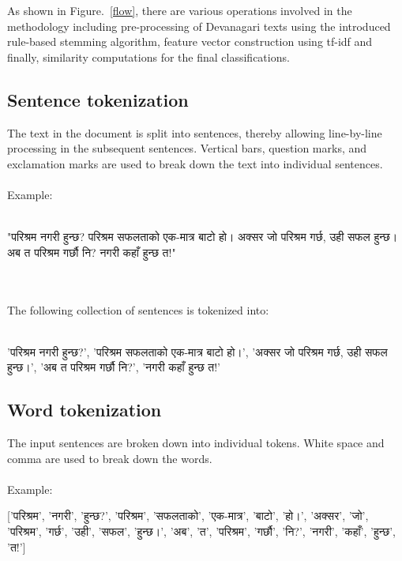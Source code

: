 \documentclass[conference]{IEEEtran}
\begin{document}
As shown in Figure.~\ref{flow}, there are various operations involved in the
methodology including pre-processing of Devanagari texts using the introduced 
rule-based stemming algorithm, feature vector construction using tf-idf and
finally, similarity computations for the final classifications.

\subsection{Sentence tokenization}

The text in the document is split into sentences, thereby allowing line-by-line
processing in the subsequent sentences. Vertical bars, question marks, and 
exclamation marks are used to break down the text into individual sentences. \\
\\Example:\\\\
\begin{sanskrit}
  "परिश्रम नगरी हुन्छ? परिश्रम सफलताको एक-मात्र बाटो हो। अक्सर जो परिश्रम गर्छ, उही सफल हुन्छ। अब त परिश्रम गर्छौ नि? नगरी कहाँ हुन्छ त!"
\end{sanskrit}\\\\
The following collection of sentences is tokenized into:\\\\
  \begin{sanskrit}
  'परिश्रम नगरी हुन्छ?', 'परिश्रम सफलताको एक-मात्र बाटो हो।', 'अक्सर जो परिश्रम गर्छ, उही सफल हुन्छ।', 'अब त परिश्रम गर्छौ नि?', 'नगरी कहाँ हुन्छ त!'
\end{sanskrit}
\medskip

\subsection{Word tokenization}

The input sentences are broken down into individual tokens. White space and
comma are used to break down the words. \\
\\Example:\\
\begin{sanskrit}
  
['परिश्रम', 'नगरी', 'हुन्छ?', 'परिश्रम', 'सफलताको', 'एक-मात्र', 'बाटो', 'हो।', 'अक्सर', 'जो', 'परिश्रम', 'गर्छ', 'उही', 'सफल', 'हुन्छ।', 'अब', 'त', 'परिश्रम', 'गर्छौ', 'नि?', 'नगरी', 'कहाँ', 'हुन्छ', 'त!']
\end{sanskrit}
\medskip
\end{document}
